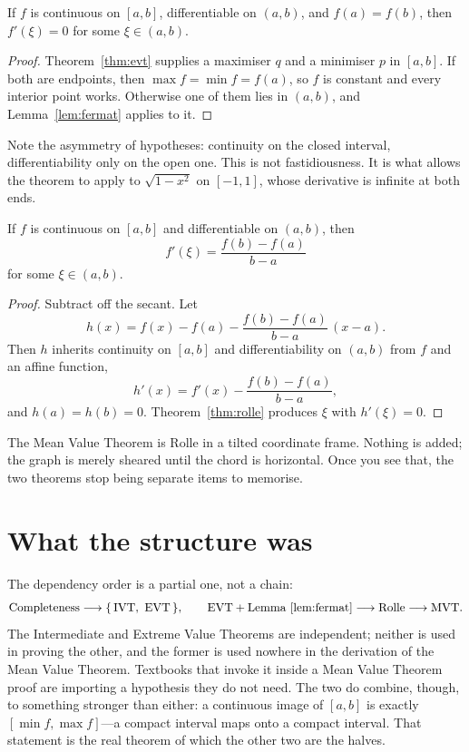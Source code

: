 \documentclass{essay}
\begin{document}
\begin{theorem}[Rolle]\label{thm:rolle}
  If \(f\) is continuous on \([a,b]\), differentiable on \((a,b)\), and \(f(a) = f(b)\), then \(f'(\xi) = 0\) for some \(\xi \in (a,b)\).
\end{theorem}

\begin{proof}
  Theorem~\ref{thm:evt} supplies a maximiser \(q\) and a minimiser \(p\) in \([a,b]\). If both are endpoints, then \(\max f = \min f = f(a)\), so \(f\) is constant and every interior point works. Otherwise one of them lies in \((a,b)\), and Lemma~\ref{lem:fermat} applies to it.
\end{proof}

Note the asymmetry of hypotheses: continuity on the closed interval, differentiability only on the open one. This is not fastidiousness. It is what allows the theorem to apply to \(\sqrt{1 - x^{2}}\) on \([-1,1]\), whose derivative is infinite at both ends.

\begin{theorem}\label{thm:mvt}
  If \(f\) is continuous on \([a,b]\) and differentiable on \((a,b)\), then
  \[ f'(\xi) = \frac{f(b) - f(a)}{b - a} \]
  for some \(\xi \in (a,b)\).
\end{theorem}

\begin{proof}
  Subtract off the secant. Let
  \[ h(x) = f(x) - f(a) - \frac{f(b) - f(a)}{b - a}\,(x - a). \]
  Then \(h\) inherits continuity on \([a,b]\) and differentiability on \((a,b)\) from \(f\) and an affine function,
  \[ h'(x) = f'(x) - \frac{f(b) - f(a)}{b - a}, \]
  and \(h(a) = h(b) = 0\). Theorem~\ref{thm:rolle} produces \(\xi\) with \(h'(\xi) = 0\).
\end{proof}

The Mean Value Theorem is Rolle in a tilted coordinate frame. Nothing is added; the graph is merely sheared until the chord is horizontal. Once you see that, the two theorems stop being separate items to memorise.

\section{What the structure was}

The dependency order is a partial one, not a chain:
\[ \text{Completeness} \longrightarrow \{\,\text{IVT},\ \text{EVT}\,\}, \qquad \text{EVT} + \text{Lemma \ref{lem:fermat}} \longrightarrow \text{Rolle} \longrightarrow \text{MVT}. \]
The Intermediate and Extreme Value Theorems are independent; neither is used in proving the other, and the former is used nowhere in the derivation of the Mean Value Theorem. Textbooks that invoke it inside a Mean Value Theorem proof are importing a hypothesis they do not need. The two do combine, though, to something stronger than either: a continuous image of \([a,b]\) is exactly \([\min f, \max f]\)---a compact interval maps onto a compact interval. That statement is the real theorem of which the other two are the halves.
\end{document}
